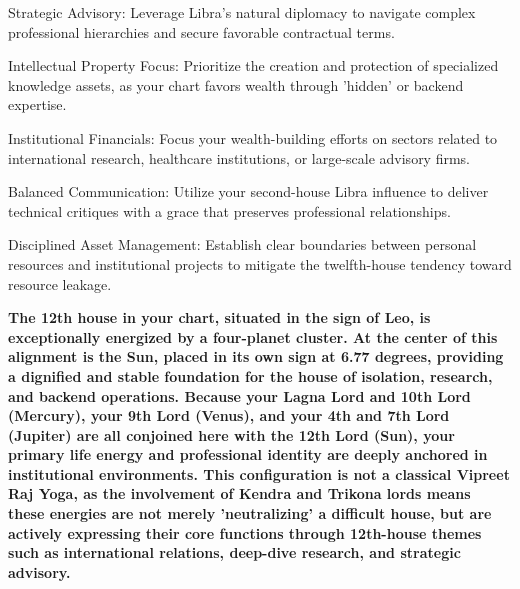 \begin{diamondlist}
  \item {\fontsize{8.5}{12}\selectfont Strategic Advisory: Leverage Libra's natural diplomacy to navigate complex professional hierarchies and secure favorable contractual terms.}
  \item {\fontsize{8.5}{12}\selectfont Intellectual Property Focus: Prioritize the creation and protection of specialized knowledge assets, as your chart favors wealth through 'hidden' or backend expertise.}
  \item {\fontsize{8.5}{12}\selectfont Institutional Financials: Focus your wealth-building efforts on sectors related to international research, healthcare institutions, or large-scale advisory firms.}
  \item {\fontsize{8.5}{12}\selectfont Balanced Communication: Utilize your second-house Libra influence to deliver technical critiques with a grace that preserves professional relationships.}
  \item {\fontsize{8.5}{12}\selectfont Disciplined Asset Management: Establish clear boundaries between personal resources and institutional projects to mitigate the twelfth-house tendency toward resource leakage.}
\end{diamondlist}


\label{topic23}

{\fontsize{9.5}{13.8}\selectfont\bfseries\color{DeepSlate} The 12th house in your chart, situated in the sign of Leo, is exceptionally energized by a four-planet cluster. At the center of this alignment is the Sun, placed in its own sign at 6.77 degrees, providing a dignified and stable foundation for the house of isolation, research, and backend operations. Because your Lagna Lord and 10th Lord (Mercury), your 9th Lord (Venus), and your 4th and 7th Lord (Jupiter) are all conjoined here with the 12th Lord (Sun), your primary life energy and professional identity are deeply anchored in institutional environments. This configuration is not a classical Vipreet Raj Yoga, as the involvement of Kendra and Trikona lords means these energies are not merely 'neutralizing' a difficult house, but are actively expressing their core functions through 12th-house themes such as international relations, deep-dive research, and strategic advisory.}\par\vspace{2mm}

